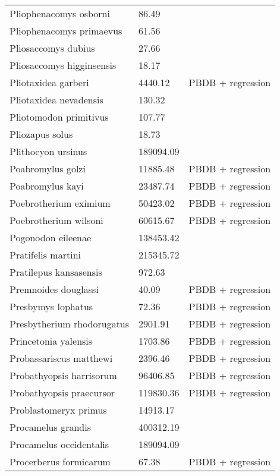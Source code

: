 \begin{center}
\begin{longtable}{p{} p{} p{} }
  Pliophenacomys osborni & 86.49 & \cite{Tomiya2013} \\ 
  Pliophenacomys primaevus & 61.56 & \cite{Tomiya2013} \\ 
  Pliosaccomys dubius & 27.66 & \cite{Tomiya2013} \\ 
  Pliosaccomys higginsensis & 18.17 & \cite{Tomiya2013} \\ 
  Pliotaxidea garberi & 4440.12 & PBDB + regression \\ 
  Pliotaxidea nevadensis & 130.32 & \cite{Tomiya2013} \\ 
  Pliotomodon primitivus & 107.77 & \cite{Tomiya2013} \\ 
  Pliozapus solus & 18.73 & \cite{Tomiya2013} \\ 
  Plithocyon ursinus & 189094.09 & \cite{Tomiya2013} \\ 
  Poabromylus golzi & 11885.48 & PBDB + regression \\ 
  Poabromylus kayi & 23487.74 & PBDB + regression \\ 
  Poebrotherium eximium & 50423.02 & PBDB + regression \\ 
  Poebrotherium wilsoni & 60615.67 & PBDB + regression \\ 
  Pogonodon eileenae & 138453.42 & \cite{Fox2011b} \\ 
  Pratifelis martini & 215345.72 & \cite{Tomiya2013} \\ 
  Pratilepus kansasensis & 972.63 & \cite{Tomiya2013} \\ 
  Premnoides douglassi & 40.09 & PBDB + regression \\ 
  Presbymys lophatus & 72.36 & PBDB + regression \\ 
  Presbytherium rhodorugatus & 2901.91 & PBDB + regression \\ 
  Princetonia yalensis & 1703.86 & PBDB + regression \\ 
  Probassariscus matthewi & 2396.46 & PBDB + regression \\ 
  Probathyopsis harrisorum & 96406.85 & PBDB + regression \\ 
  Probathyopsis praecursor & 119830.36 & PBDB + regression \\ 
  Problastomeryx primus & 14913.17 & \cite{Tomiya2013} \\ 
  Procamelus grandis & 400312.19 & \cite{Tomiya2013} \\ 
  Procamelus occidentalis & 189094.09 & \cite{Tomiya2013} \\ 
  Procerberus formicarum & 67.38 & PBDB + regression \\ 

\end{longtable}
\end{center}

